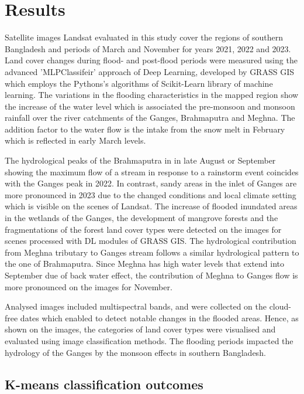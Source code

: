 \documentclass[water,article,submit,pdftex,moreauthors]{Definitions/mdpi}
\begin{document}
\section{Results}

Satellite images Landsat evaluated in this study cover the regions of southern Bangladesh and periods of March and November for years 2021, 2022 and 2023. Land cover changes during flood- and post-flood periods were measured using the advanced 'MLPClassifeir' approach of Deep Learning, developed by GRASS GIS which employs the Pythons's algorithms of Scikit-Learn library of machine learning. The variations in the flooding characteristics in the mapped region show the increase of the water level which is associated the pre-monsoon and monsoon rainfall over the river catchments of the Ganges, Brahmaputra and Meghna. The addition factor to the water flow is the intake from the snow melt in February which is reflected in early March levels. 

The hydrological peaks of the Brahmaputra in  in late August or September showing the maximum flow of a stream in response to a rainstorm event coincides with the Ganges peak in 2022. In contrast, sandy areas in the inlet of Ganges are more pronounced in 2023 due to the changed conditions and local climate setting which is visible on the scenes of Landsat. The increase of flooded inundated areas in the wetlands of the Ganges, the development of mangrove forests and the fragmentations of the forest land cover types were detected on the images for scenes processed with DL modules of GRASS GIS. The hydrological contribution from Meghna tributary to Ganges stream follows a similar hydrological pattern to the one of Brahmaputra. Since Meghna has high water levels that extend into September due of back water effect, the contribution of Meghna to Ganges flow is more pronounced on the images for November.

Analysed images included multispectral bands, and were collected on the cloud-free dates which enabled to detect notable changes in the flooded areas. Hence, as shown on the images, the categories of land cover types were visualised and evaluated using image classification methods. The flooding periods impacted the hydrology of the Ganges by the monsoon effects in southern Bangladesh.

\subsection{K-means classification outcomes}
\end{document}
